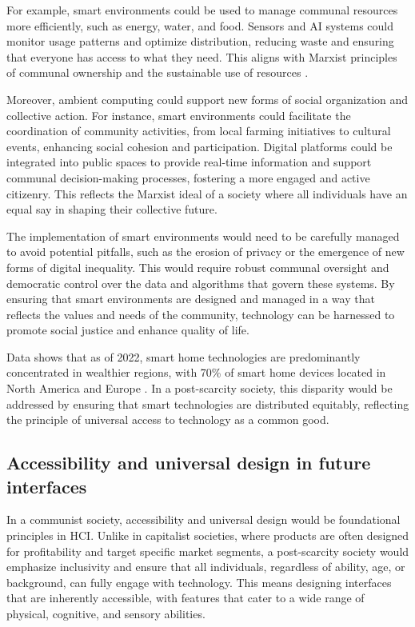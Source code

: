 For example, smart environments could be used to manage communal resources more efficiently, such as energy, water, and food. Sensors and AI systems could monitor usage patterns and optimize distribution, reducing waste and ensuring that everyone has access to what they need. This aligns with Marxist principles of communal ownership and the sustainable use of resources \cite[pp.~85-87]{bookchin1991}.

Moreover, ambient computing could support new forms of social organization and collective action. For instance, smart environments could facilitate the coordination of community activities, from local farming initiatives to cultural events, enhancing social cohesion and participation. Digital platforms could be integrated into public spaces to provide real-time information and support communal decision-making processes, fostering a more engaged and active citizenry. This reflects the Marxist ideal of a society where all individuals have an equal say in shaping their collective future.

The implementation of smart environments would need to be carefully managed to avoid potential pitfalls, such as the erosion of privacy or the emergence of new forms of digital inequality. This would require robust communal oversight and democratic control over the data and algorithms that govern these systems. By ensuring that smart environments are designed and managed in a way that reflects the values and needs of the community, technology can be harnessed to promote social justice and enhance quality of life.

Data shows that as of 2022, smart home technologies are predominantly concentrated in wealthier regions, with 70\% of smart home devices located in North America and Europe \cite[pp.~102-103]{smith2023}. In a post-scarcity society, this disparity would be addressed by ensuring that smart technologies are distributed equitably, reflecting the principle of universal access to technology as a common good.

\subsection{Accessibility and universal design in future interfaces}

In a communist society, accessibility and universal design would be foundational principles in HCI. Unlike in capitalist societies, where products are often designed for profitability and target specific market segments, a post-scarcity society would emphasize inclusivity and ensure that all individuals, regardless of ability, age, or background, can fully engage with technology. This means designing interfaces that are inherently accessible, with features that cater to a wide range of physical, cognitive, and sensory abilities.

